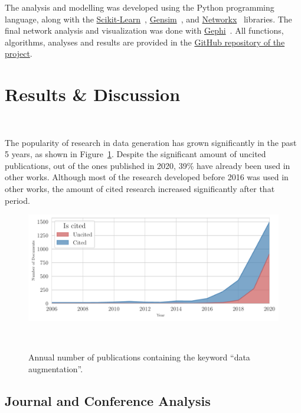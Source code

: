 \documentclass[parskip=full]{scrartcl}
\begin{document}
The analysis and modelling was developed using the Python programming
language, along with the
\href{https://scikit-learn.org/stable/}{Scikit-Learn}~\cite{Pedregosa2011},
\href{https://radimrehurek.com/gensim/}{Gensim}~\cite{Rehurek2010}, and
\href{https://networkx.org/}{Networkx}~\cite{Hagberg2008} libraries. The final
network analysis and visualization was done with
\href{https://gephi.org/}{Gephi}~\cite{Bastian2009}. All functions,
algorithms, analyses and results are provided in the
\href{https://github.com/joaopfonseca/research}{GitHub repository of the
project}.

\section{Results \& Discussion}~\label{sec:results_discussion}

The popularity of research in data generation has grown significantly in the
past 5 years, as shown in Figure~\ref{fig:area_chart_cited_documents}. Despite
the significant amount of uncited publications, out of the ones published in
2020, 39\% have already been used in other works. Although most of the
research developed before 2016 was used in other works, the amount of cited
research increased significantly after that period.

\begin{figure}[H]
	\centering
    \includegraphics[width=\linewidth]{../analysis/area_chart_cited_documents}
    \caption{Annual number of publications containing the keyword ``data
        augmentation''.
    }~\label{fig:area_chart_cited_documents}
\end{figure}


\subsection{Journal and Conference Analysis}
\end{document}
